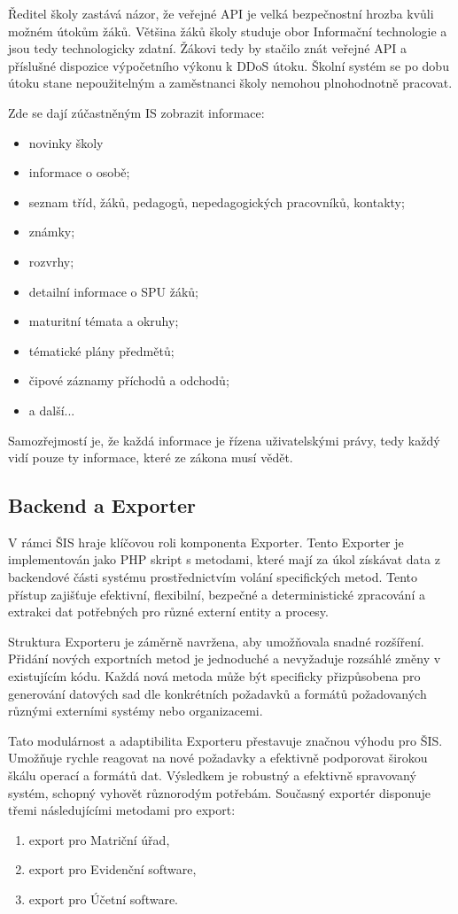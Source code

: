 \documentclass[FM,Proj]{tulthesis}
\begin{document}
Ředitel školy zastává názor, že veřejné API je velká bezpečnostní hrozba kvůli možném útokům
žáků. Většina žáků školy studuje obor Informační technologie a jsou tedy technologicky zdatní.
Žákovi tedy by stačilo znát veřejné API a příslušné dispozice výpočetního výkonu k DDoS útoku.
Školní systém se po dobu útoku stane nepoužitelným a zaměstnanci školy nemohou plnohodnotně
pracovat.

Zde se dají zúčastněným IS zobrazit informace:
\begin{itemize}
    \item novinky školy
    \item informace o osobě;
    \item seznam tříd, žáků, pedagogů, nepedagogických pracovníků, kontakty;
    \item známky;
    \item rozvrhy;
    \item detailní informace o SPU žáků;
    \item maturitní témata a okruhy;
    \item tématické plány předmětů;
    \item čipové záznamy příchodů a odchodů;
    \item a další...


\end{itemize}
Samozřejmostí je, že každá informace je řízena uživatelskými právy, tedy každý vidí pouze ty
informace, které ze zákona musí vědět.

\subsection{Backend a Exporter}
\label{section:backend-a-exporter}
V rámci ŠIS hraje klíčovou roli komponenta Exporter. Tento Exporter je implementován
jako PHP skript s metodami, které mají za úkol získávat data z backendové části 
systému prostřednictvím volání specifických metod. Tento přístup zajišťuje efektivní,
flexibilní, bezpečné a deterministické zpracování a extrakci dat potřebných pro různé
externí entity a procesy.

Struktura Exporteru je záměrně navržena, aby umožňovala snadné rozšíření. Přidání
nových exportních metod je jednoduché a nevyžaduje rozsáhlé změny v existujícím kódu.
Každá nová metoda může být specificky přizpůsobena pro generování datových sad
dle konkrétních požadavků a formátů požadovaných různými externími systémy nebo
organizacemi.

Tato modulárnost a adaptibilita Exporteru přestavuje značnou výhodu pro ŠIS. Umožňuje
rychle reagovat na nové požadavky a efektivně podporovat širokou škálu operací
a formátů dat. Výsledkem je robustný a efektivně spravovaný systém, schopný vyhovět
různorodým potřebám. Současný exportér disponuje třemi následujícími metodami
pro export:
\begin{enumerate}
    \item\label{export:matricni-urad} export pro Matriční úřad,
    \item\label{export:evidencni-software} export pro Evidenční software,
    \item\label{export:ucetni-software} export pro Účetní software.
\end{enumerate}
\end{document}
